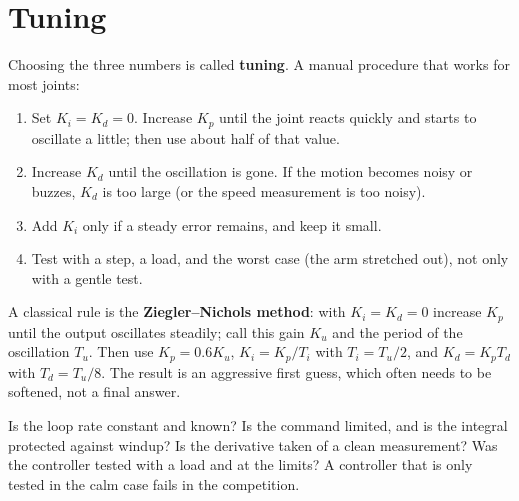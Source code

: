 \section*{Tuning}
Choosing the three numbers is called \textbf{tuning}. A manual procedure that works for most joints:
\begin{enumerate}[nosep]
  \item Set $K_i=K_d=0$. Increase $K_p$ until the joint reacts quickly and starts to oscillate a little; then use about half of that value.
  \item Increase $K_d$ until the oscillation is gone. If the motion becomes noisy or buzzes, $K_d$ is too large (or the speed measurement is too noisy).
  \item Add $K_i$ only if a steady error remains, and keep it small.
  \item Test with a step, a load, and the worst case (the arm stretched out), not only with a gentle test.
\end{enumerate}
A classical rule is the \textbf{Ziegler--Nichols method}: with $K_i=K_d=0$ increase $K_p$ until the output oscillates steadily; call this gain $K_u$ and the period of the oscillation $T_u$. Then use $K_p=0.6K_u$, $K_i=K_p/T_i$ with $T_i=T_u/2$, and $K_d=K_pT_d$ with $T_d=T_u/8$. The result is an aggressive first guess, which often needs to be softened, not a final answer.

\begin{keyidea}
Is the loop rate constant and known? Is the command limited, and is the integral protected against windup? Is the derivative taken of a clean measurement? Was the controller tested with a load and at the limits? A controller that is only tested in the calm case fails in the competition.
\end{keyidea}


